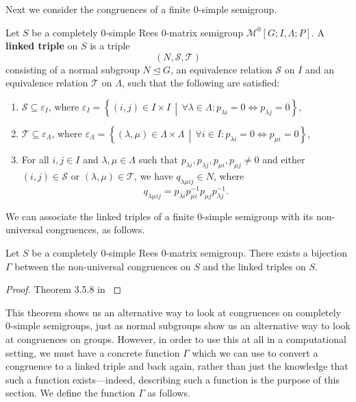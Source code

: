 Next we consider the congruences of a finite 0-simple semigroup.

\begin{definition}
  \label{def:linked-triple}
  Let $S$ be a completely 0-simple Rees 0-matrix semigroup
  $\mathcal{M}^0[G;I,\Lambda;P]$.  A \textbf{linked triple} on $S$ is a
  triple $$(N,\mathcal{S},\mathcal{T})$$ consisting of a normal subgroup
  $N \trianglelefteq G$, an equivalence relation $\mathcal{S}$ on $I$ and an
  equivalence relation $\mathcal{T}$ on $\Lambda$, such that the following are
  satisfied:
  \begin{enumerate}
  \item $\mathcal{S} \subseteq \varepsilon_I$, where $\varepsilon_I =
    \left\{(i,j) \in I \times I\, \middle|\, \forall \lambda \in \Lambda:
      p_{\lambda i}=0 \iff p_{\lambda j}=0 \right\}$,
  \item $\mathcal{T} \subseteq \varepsilon_\Lambda$, where $\varepsilon_\Lambda
    = \left\{(\lambda,\mu) \in \Lambda \times \Lambda\, \middle|\, \forall i \in
      I: p_{\lambda i}=0 \iff p_{\mu i}=0 \right\}$,
  \item For all $i,j \in I$ and $\lambda, \mu \in \Lambda$ such that
    $p_{\lambda i}, p_{\lambda j}, p_{\mu i}, p_{\mu j} \neq 0$ and either
    $(i,j) \in \mathcal{S}$ or $(\lambda,\mu) \in \mathcal{T}$, we have
    $q_{\lambda \mu i j} \in N$, where
    $$q_{\lambda \mu i j} = p_{\lambda i} p_{\mu i}^{-1} p_{\mu j} p_{\lambda
      j}^{-1}.$$
  \end{enumerate}
  \cite[\S 3.5]{howie}
\end{definition}

We can associate the linked triples of a finite 0-simple semigroup with its
non-universal congruences, as follows.

\begin{theorem}
  \label{thm:linked-triple}
  Let $S$ be a completely 0-simple Rees 0-matrix semigroup.  There exists a
  bijection $\Gamma$ between the non-universal congruences on $S$ and the linked
  triples on $S$.
  \begin{proof}
    Theorem 3.5.8 in \cite{howie}
  \end{proof}
\end{theorem}

This theorem shows us an alternative way to look at congruences on completely
0-simple semigroups, just as normal subgroups show us an alternative way to look
at congruences on groups.  However, in order to use this at all in a
computational setting, we must have a concrete function $\Gamma$ which we can
use to convert a congruence to a linked triple and back again, rather than just
the knowledge that such a function exists---indeed, describing such a function
is the purpose of this section.  We define the function $\Gamma$ as follows.

